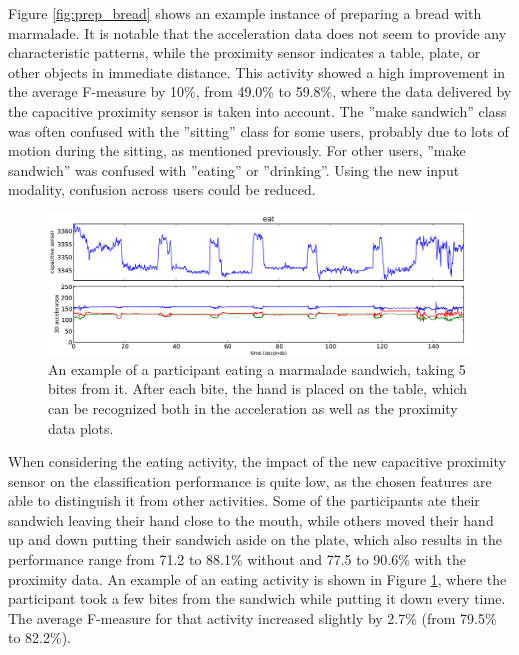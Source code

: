 \documentclass[runningheads,a4paper]{llncs}
\begin{document}
Figure \ref{fig:prep_bread} shows an example instance of preparing a bread with marmalade. It is notable that the acceleration data does not seem to provide any characteristic patterns, while the proximity sensor indicates a table, plate, or other objects in immediate distance. This activity showed a high improvement in the average F-measure by 10\%, from 49.0\% to 59.8\%, where the data delivered by the capacitive proximity sensor is taken into account. The ''make sandwich'' class was often confused with the ''sitting'' class for some users, probably due to lots of motion during the sitting, as mentioned previously. For other users, ''make sandwich'' was confused with ''eating'' or ''drinking''. Using the new input modality, confusion across users could be reduced.

\begin{figure}
	\centering
		\includegraphics[width=\textwidth]{../Auswertung/images/eugen_6.pdf}
	\caption{An example of a participant eating a marmalade sandwich, taking 5 bites from it. After each bite, the hand is placed on the table, which can be recognized both in the acceleration as well as the proximity data plots.}
	\label{fig:eating}
\end{figure}

When considering the eating activity, the impact of the new capacitive proximity sensor on the classification performance is quite low, as the chosen features are able to distinguish it from other activities. Some of the participants ate their sandwich leaving their hand close to the mouth, while others moved their hand up and down putting their sandwich aside on the plate, which also results in the performance range from 71.2 to 88.1\% without and 77.5 to 90.6\% with the proximity data. An example of an eating activity is shown in Figure \ref{fig:eating}, where the participant took a few bites from the sandwich while putting it down every time. The average F-measure for that activity increased slightly by 2.7\% (from 79.5\% to 82.2\%). 
\end{document}
